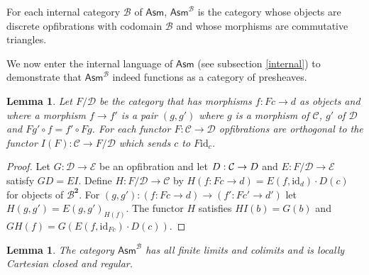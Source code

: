 \documentclass{amsart}
\theoremstyle{plain}
\newtheorem{lemma}[theorem]{Lemma}
\theoremstyle{definition}
\newcommand\cat\mathcal
\newcommand\id{\mathrm{id}}
\newcommand\Asm{\mathsf{Asm}}
\newcommand\sier{{\mathbf 2}}
\begin{document}
For each internal category $\cat B$ of $\Asm$, $\Asm^{\cat B}$ is the category whose objects are discrete opfibrations with codomain $\cat B$ and whose morphisms are commutative triangles. 

We now enter the internal language of $\Asm$ (see subsection \ref{internal}) to demonstrate that $\Asm^{\cat B}$ indeed functions as a category of presheaves.

\begin{lemma} Let $F/\cat D$ be the category that has morphisms $f:Fc\to d$ as objects and where a morphism $f\to f'$ is a pair $(g,g')$ where $g$ is a morphism of $\cat C$, $g'$ of $\cat D$ and $Fg'\circ f=f'\circ Fg$. For each functor $F:\cat C\to \cat D$ opfibrations are orthogonal to the functor $I(F):\cat C \to F/\cat D$ which sends $c$ to $F\id_c$. \label{Yoneda} \end{lemma}

\begin{proof} Let $G:\cat D\to\cat E$ be an opfibration and let $D:\cat C\to \cat \cat D$ and $E:F/\cat D \to \cat E$ satisfy $GD=EI$. Define $H:F/\cat D\to \cat C$ by $H(f:Fc\to d) = E(f,\id_{d})\cdot D(c)$ for objects of $\cat B^\sier$. For $(g,g'):(f:Fc\to d) \to (f':Fc'\to d')$ let $H(g,g') = E(g,g')_{H(f)}$. The functor $H$ satisfies $HI(b) = G(b)$ and $GH(f) = G(E(f,\id_{Fc})\cdot D(c))$.
\end{proof}

\begin{lemma} The category $\Asm^{\cat B}$ has all finite limits and colimits and is locally Cartesian closed and regular. \end{lemma}
\end{document}
